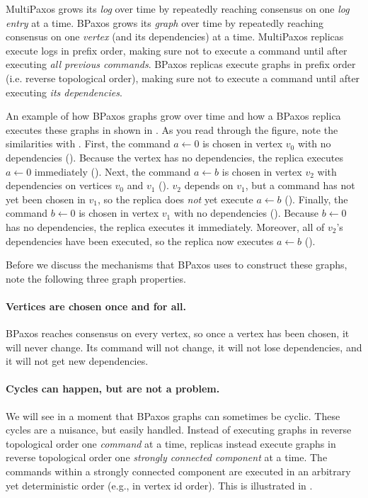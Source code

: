 MultiPaxos grows its \emph{log} over time by repeatedly reaching consensus on
one \emph{log entry} at a time. BPaxos grows its \emph{graph} over time by
repeatedly reaching consensus on one \emph{vertex} (and its dependencies) at a
time. MultiPaxos replicas execute logs in prefix order, making sure not to
execute a command until after executing \emph{all previous commands}. BPaxos
replicas execute graphs in prefix order (i.e. reverse topological order),
making sure not to execute a command until after executing \emph{its
dependencies}.

An example of how BPaxos graphs grow over time and how a BPaxos replica
executes these graphs in shown in . As you read
through the figure, note the similarities with
.
%
First, the command $a \gets 0$ is chosen in vertex $v_0$ with no dependencies
().
%
Because the vertex has no dependencies, the replica executes $a \gets 0$
immediately ().
%
Next, the command $a \gets b$ is chosen in vertex $v_2$ with dependencies on
vertices $v_0$ and $v_1$ ().
%
$v_2$ depends on $v_1$, but a command has not yet been chosen in $v_1$, so the
replica does \emph{not} yet execute $a \gets b$
().
%
Finally, the command $b \gets 0$ is chosen in vertex $v_1$ with no
dependencies ().
%
Because $b \gets 0$ has no dependencies, the replica executes it immediately.
Moreover, all of $v_2$'s dependencies have been executed, so the replica now
executes $a \gets b$ ().

{}

Before we discuss the mechanisms that BPaxos uses to construct these graphs,
note the following three graph properties.

\paragraph{Vertices are chosen once and for all.}
BPaxos reaches consensus on every vertex, so once a vertex has been chosen, it
will never change. Its command will not change, it will not lose dependencies,
and it will not get new dependencies.

\paragraph{Cycles can happen, but are not a problem.}
We will see in a moment that BPaxos graphs can sometimes be cyclic. These cycles
are a nuisance, but easily handled. Instead of executing graphs in reverse
topological order one \emph{command} at a time, replicas instead execute graphs
in reverse topological order one \emph{strongly connected component} at a time.
The commands within a strongly connected component are executed in an arbitrary
yet deterministic order (e.g., in vertex id order). This is illustrated in
.

